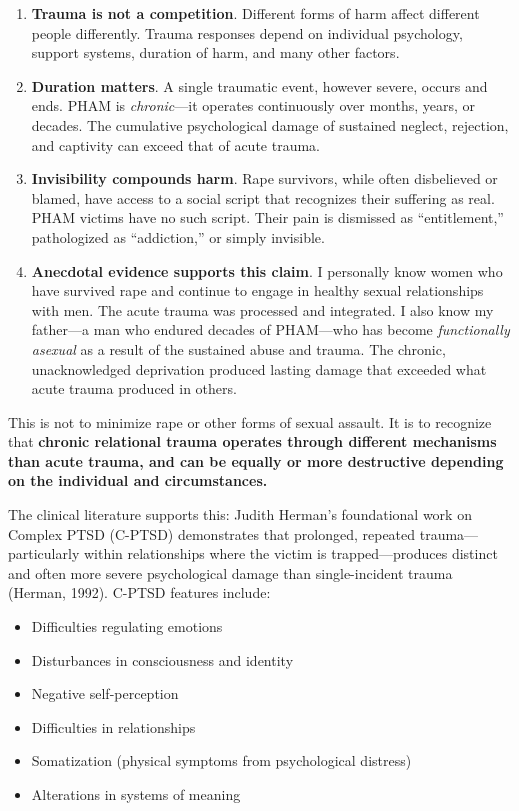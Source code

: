 \documentclass[12pt, letterpaper]{article}
\begin{document}
\begin{enumerate}
    \item \textbf{Trauma is not a competition}. Different forms of harm affect different people differently. Trauma responses depend on individual psychology, support systems, duration of harm, and many other factors.
    
    \item \textbf{Duration matters}. A single traumatic event, however severe, occurs and ends. PHAM is \textit{chronic}---it operates continuously over months, years, or decades. The cumulative psychological damage of sustained neglect, rejection, and captivity can exceed that of acute trauma.
    
    \item \textbf{Invisibility compounds harm}. Rape survivors, while often disbelieved or blamed, have access to a social script that recognizes their suffering as real. PHAM victims have no such script. Their pain is dismissed as ``entitlement,'' pathologized as ``addiction,'' or simply invisible.
    
    \item \textbf{Anecdotal evidence supports this claim}. I personally know women who have survived rape and continue to engage in healthy sexual relationships with men. The acute trauma was processed and integrated. I also know my father---a man who endured decades of PHAM---who has become \textit{functionally asexual} as a result of the sustained abuse and trauma. The chronic, unacknowledged deprivation produced lasting damage that exceeded what acute trauma produced in others.
\end{enumerate}

This is not to minimize rape or other forms of sexual assault. It is to recognize that \textbf{chronic relational trauma operates through different mechanisms than acute trauma, and can be equally or more destructive depending on the individual and circumstances.}

The clinical literature supports this: Judith Herman's foundational work on Complex PTSD (C-PTSD) demonstrates that prolonged, repeated trauma---particularly within relationships where the victim is trapped---produces distinct and often more severe psychological damage than single-incident trauma (Herman, 1992). C-PTSD features include:

\begin{itemize}
    \item Difficulties regulating emotions
    \item Disturbances in consciousness and identity
    \item Negative self-perception
    \item Difficulties in relationships
    \item Somatization (physical symptoms from psychological distress)
    \item Alterations in systems of meaning
\end{itemize}
\end{document}
